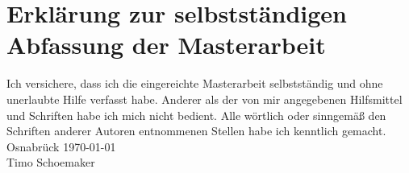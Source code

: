 \chapter*{Erklärung zur selbstständigen Abfassung der Masterarbeit}

Ich versichere, dass ich die eingereichte Masterarbeit selbstständig und ohne unerlaubte Hilfe verfasst habe. Anderer als der von mir angegebenen Hilfsmittel und Schriften habe ich mich nicht bedient. Alle wörtlich oder sinngemäß den Schriften anderer Autoren entnommenen Stellen habe ich kenntlich gemacht. \\


\bigskip
\bigskip
\bigskip
\bigskip
\noindent
Osnabrück \today\\

\bigskip
\bigskip
\bigskip
\bigskip
\noindent
Timo Schoemaker